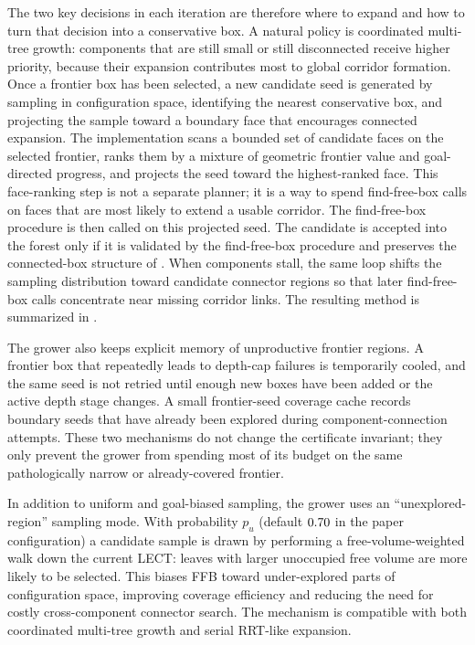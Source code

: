 \documentclass[journal]{IEEEtran}
\begin{document}
The two key decisions in each iteration are therefore where to expand and how
to turn that decision into a conservative box. A natural policy is coordinated
multi-tree growth: components that are still small or still disconnected
receive higher priority, because their expansion contributes most to global
corridor formation. Once a frontier box has been selected, a new candidate seed
is generated by sampling in configuration space, identifying the nearest
conservative box, and projecting the sample toward a boundary face that
encourages connected expansion. The implementation scans a bounded set of
candidate faces on the selected frontier, ranks them by a mixture of geometric
frontier value and goal-directed progress, and projects the seed toward the
highest-ranked face. This face-ranking step is not a separate planner; it is a
way to spend find-free-box calls on faces that are most likely to extend a
usable corridor. The find-free-box procedure is then called on this projected seed.
  The candidate is accepted into the forest only if it is validated by the
  find-free-box procedure and preserves the connected-box structure of
  . When
components stall, the same loop shifts the sampling distribution toward
candidate connector regions so that later find-free-box calls concentrate near
missing corridor links. The resulting method is summarized in
.

The grower also keeps explicit memory of unproductive frontier regions. A
frontier box that repeatedly leads to depth-cap failures is temporarily cooled,
and the same seed is not retried until enough new boxes have been added or the
active depth stage changes. A small frontier-seed coverage cache records
boundary seeds that have already been explored during component-connection
attempts. These two mechanisms do not change the certificate invariant; they
only prevent the grower from spending most of its budget on the same
pathologically narrow or already-covered frontier.

In addition to uniform and goal-biased sampling, the grower uses an
``unexplored-region'' sampling mode. With probability $p_u$ (default
$0.70$ in the paper configuration) a candidate sample is drawn by
performing a free-volume-weighted walk down the current LECT: leaves with
larger unoccupied free volume are more likely to be selected. This biases FFB
toward under-explored parts of configuration space, improving coverage
efficiency and reducing the need for costly cross-component connector search. The
mechanism is compatible with both coordinated multi-tree growth and serial
RRT-like expansion.
\end{document}
